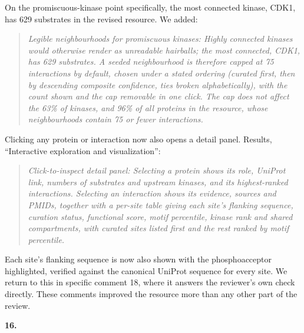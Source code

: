 \documentclass[
]{article}
\begin{document}
On the promiscuous-kinase point specifically, the most connected kinase,
CDK1, has 629 substrates in the revised resource. We added:

\begin{quote}
\emph{Legible neighbourhoods for promiscuous kinases: Highly connected
kinases would otherwise render as unreadable hairballs; the most
connected, CDK1, has 629 substrates. A seeded neighbourhood is therefore
capped at 75 interactions by default, chosen under a stated ordering
(curated first, then by descending composite confidence, ties broken
alphabetically), with the count shown and the cap removable in one
click. The cap does not affect the 63\% of kinases, and 96\% of all
proteins in the resource, whose neighbourhoods contain 75 or fewer
interactions.}
\end{quote}

Clicking any protein or interaction now also opens a detail panel.
Results, ``Interactive exploration and visualization'':

\begin{quote}
\emph{Click-to-inspect detail panel: Selecting a protein shows its role,
UniProt link, numbers of substrates and upstream kinases, and its
highest-ranked interactions. Selecting an interaction shows its
evidence, sources and PMIDs, together with a per-site table giving each
site's flanking sequence, curation status, functional score, motif
percentile, kinase rank and shared compartments, with curated sites
listed first and the rest ranked by motif percentile.}
\end{quote}

Each site's flanking sequence is now also shown with the phosphoacceptor
highlighted, verified against the canonical UniProt sequence for every
site. We return to this in specific comment 18, where it answers the
reviewer's own check directly. These comments improved the resource more
than any other part of the review.

\textbf{16.}
\end{document}
